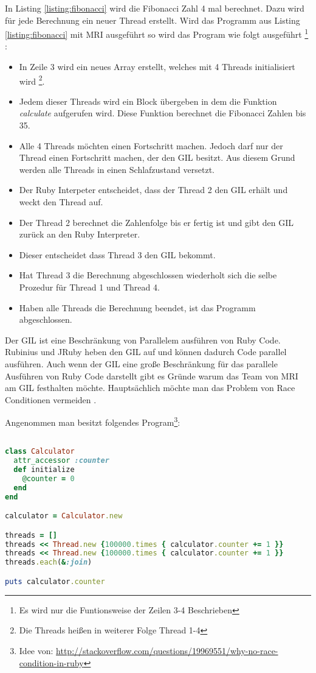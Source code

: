 In Listing \ref{listing:fibonacci} wird die Fibonacci Zahl 4 mal berechnet. Dazu wird für jede Berechnung ein neuer Thread erstellt. Wird das Programm aus Listing \ref{listing:fibonacci} mit MRI ausgeführt so wird das Program wie folgt ausgeführt \footnote{Es wird nur die Funtionsweise der Zeilen 3-4 Beschrieben} \cite[p. 45-46]{Sto2013}: 

\begin{itemize}
  \item In Zeile 3 wird ein neues Array erstellt, welches mit 4 Threads initialisiert wird \footnote{Die Threads heißen in weiterer Folge Thread 1-4}.
  \item Jedem dieser Threads wird ein Block übergeben in dem die Funktion \emph{calculate} aufgerufen wird. Diese Funktion berechnet die Fibonacci Zahlen bis 35.
  \item Alle 4 Threads möchten einen Fortschritt machen. Jedoch darf nur der Thread einen Fortschritt machen, der den GIL besitzt. Aus diesem Grund werden alle Threads in einen Schlafzustand versetzt.
  \item Der Ruby Interpeter entscheidet, dass der Thread 2 den GIL erhält und weckt den Thread auf.
  \item Der Thread 2 berechnet die Zahlenfolge bis er fertig ist und gibt den GIL zurück an den Ruby Interpreter.
  \item Dieser entscheidet dass Thread 3 den GIL bekommt.
  \item Hat Thread 3 die Berechnung abgeschlossen wiederholt sich die selbe Prozedur für Thread 1 und Thread 4.
  \item Haben alle Threads die Berechnung beendet, ist das Programm abgeschlossen.
\end{itemize}

Der GIL ist eine Beschränkung von Parallelem ausführen von Ruby Code. Rubinius und JRuby heben den GIL auf und können dadurch Code parallel ausführen. Auch wenn der GIL eine große Beschränkung für das parallele Ausführen von Ruby Code darstellt gibt es Gründe warum das Team von MRI am GIL festhalten möchte. Hauptsächlich möchte man das Problem von Race Conditionen vermeiden \cite[p. 48-49]{Sto2013}.

Angenommen man besitzt folgendes Program\footnote{Idee von: \url{http://stackoverflow.com/questions/19969551/why-no-race-condition-in-ruby}}: 

\begin{lstlisting}[language=Ruby,label={listing:race condition}]

class Calculator
  attr_accessor :counter
  def initialize
    @counter = 0
  end
end

calculator = Calculator.new

threads = []
threads << Thread.new {100000.times { calculator.counter += 1 }}
threads << Thread.new {100000.times { calculator.counter += 1 }}
threads.each(&:join)

puts calculator.counter

\end{lstlisting}

